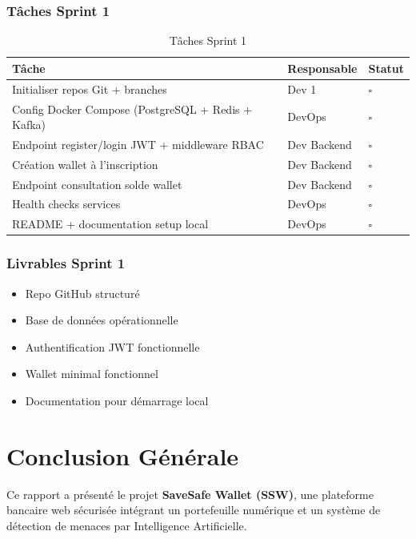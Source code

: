\documentclass[12pt,a4paper]{report}
\begin{document}
\subsection{Tâches Sprint 1}
\begin{table}[H]
\centering
\begin{tabular}{|p{6cm}|p{3cm}|p{2cm}|}
\hline
\textbf{Tâche} & \textbf{Responsable} & \textbf{Statut} \\
\hline
Initialiser repos Git + branches & Dev 1 & $\square$ \\
Config Docker Compose (PostgreSQL + Redis + Kafka) & DevOps & $\square$ \\
Endpoint register/login JWT + middleware RBAC & Dev Backend & $\square$ \\
Création wallet à l'inscription & Dev Backend & $\square$ \\
Endpoint consultation solde wallet & Dev Backend & $\square$ \\
Health checks services & DevOps & $\square$ \\
README + documentation setup local & DevOps & $\square$ \\
\hline
\end{tabular}
\caption{Tâches Sprint 1}
\end{table}

\subsection{Livrables Sprint 1}
\begin{itemize}[leftmargin=*,label=--]
\item Repo GitHub structuré
\item Base de données opérationnelle
\item Authentification JWT fonctionnelle
\item Wallet minimal fonctionnel
\item Documentation pour démarrage local
\end{itemize}

\chapter*{Conclusion Générale}

Ce rapport a présenté le projet \textbf{SaveSafe Wallet (SSW)}, une plateforme bancaire web sécurisée intégrant un portefeuille numérique et un système de détection de menaces par Intelligence Artificielle.
\end{document}
